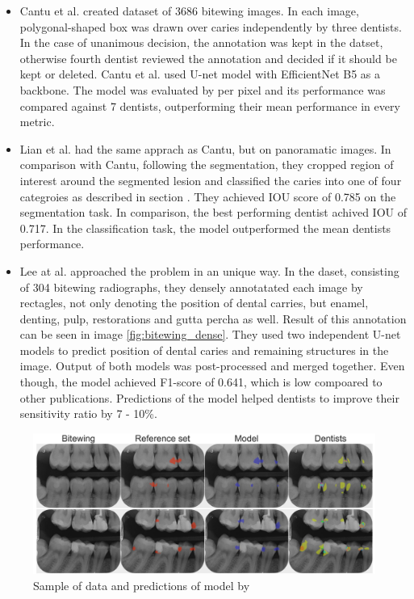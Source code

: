 \begin{itemize}
    \item{Cantu et al. \cite{Cantu2020}} created dataset of 3686 bitewing images. In each image, polygonal-shaped box was drawn over caries independently by three dentists. In the case of unanimous decision, the annotation was kept in the datset, otherwise fourth dentist reviewed the annotation and decided if it should be kept or deleted. Cantu et al. used U-net model with EfficientNet B5 as a backbone. The model was evaluated by per pixel and its performance was compared against 7 dentists, outperforming their mean performance in every metric.
    \item{Lian et al. \cite{Lian2021}} had the same apprach as Cantu, but on panoramatic images. In comparison with Cantu, following the segmentation, they cropped region of interest around the segmented lesion and classified the caries into one of four categroies as described in section . They achieved IOU score of 0.785 on the segmentation task. In comparison, the best performing dentist achived IOU of 0.717. In the classification task, the model outperformed the mean dentists performance.
    \item {Lee at al. \cite{Lee2021}} approached the problem in an unique way. In the daset, consisting of 304 bitewing radiographs, they densely annotatated each image by rectagles, not only denoting the position of dental carries, but enamel, denting, pulp, restorations and gutta percha as well. Result of this annotation can be seen in image \ref{fig:bitewing_dense}. They used two independent U-net models to predict position of dental caries and remaining structures in the image. Output of both models was post-processed and merged together. Even though, the model achieved F1-score of 0.641, which is low compoared to other publications. Predictions of the model helped dentists to improve their sensitivity ratio by 7 - 10\%.
\end{itemize}

\begin{figure}
    \centering
    \includegraphics[width=\linewidth]{images/segmentatic_literature.png}
    \caption{Sample of data and predictions of model by }
    \label{fig:segmentation_lit}
\end{figure}

